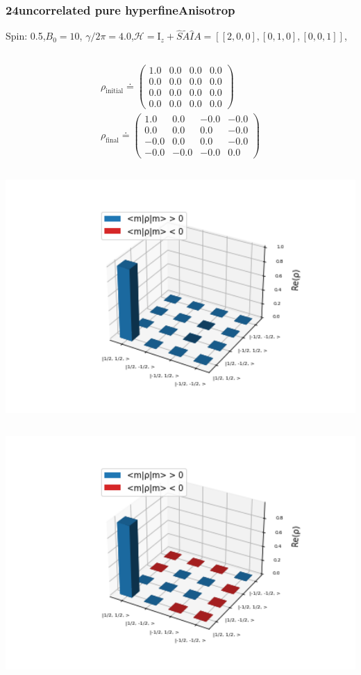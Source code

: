 \documentclass[10pt]{beamer}
\begin{document}
\begin{frame}
\frametitle{24uncorrelated pure hyperfineAnisotrop}
Spin: 0.5,$B_0= 10$, $\gamma/2\pi = 4.0$,$\mathcal{H}=\text{I}_{z}+ \hat{S}\tilde{A}\hat{I}$$A=[[2, 0, 0], [0, 1, 0], [0, 0, 1]]$,
\begin{columns}[T]
\begin{column}{.5\textwidth}
\begin{align*}
\rho_{\text{initial}}\doteq
\begin{pmatrix}
1.0 & 0.0 & 0.0 & 0.0 \\
0.0 & 0.0 & 0.0 & 0.0 \\
0.0 & 0.0 & 0.0 & 0.0 \\
0.0 & 0.0 & 0.0 & 0.0
\end{pmatrix}
\\
\rho_{\text{final}}\doteq
\begin{pmatrix}
1.0 & 0.0 & -0.0 & -0.0 \\
0.0 & 0.0 & 0.0 & -0.0 \\
-0.0 & 0.0 & 0.0 & -0.0 \\
-0.0 & -0.0 & -0.0 & 0.0
\end{pmatrix}
\end{align*}
\begin{column}{.5\textwidth}
\includegraphics[width=1.5\textwidth]{./spin1-2/24uncorrelated_pure_hyperfineAnisotrop/InitialRealPartDensityMatrix.png}
\end{column}
\begin{column}{.5\textwidth}
\includegraphics[width=1.5\textwidth]{./spin1-2/24uncorrelated_pure_hyperfineAnisotrop/EvolvedRealPartDensityMatrix.png}

\end{column}
\end{column}
\end{columns}$$
\end{frame}
\end{document}
